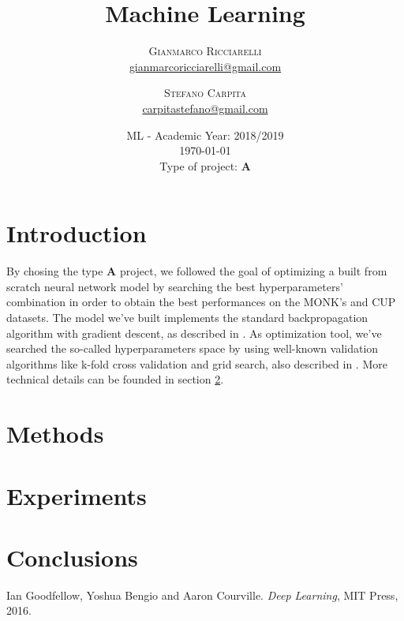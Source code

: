 \documentclass[11pt,twoside]{article}
\title{Machine Learning} %
\author{%
\textsc{Gianmarco Ricciarelli} \\[1ex] %
\normalsize \href{mailto:john@smith.com}{gianmarcoricciarelli@gmail.com} %
\and %
\textsc{Stefano Carpita} \\[1ex] %
\normalsize \href{mailto:jane@smith.com}{carpitastefano@gmail.com} %
}
\date{
    ML - Academic Year: 2018/2019 \\
    \today \\
    Type of project: \textbf{A}
}
\begin{document}
\maketitle


\section{Introduction} %
\label{sec:introduction}
    By chosing the type \textbf{A} project, we followed the goal of optimizing a built from scratch neural
    network model by searching the best hyperparameters' combination in order to obtain the best
    performances on the MONK's and CUP datasets. The model we've built implements the
    standard backpropagation algorithm with gradient descent, as described in \cite{deep_learning}. As
    optimization tool, we've searched the so-called hyperparameters space by using well-known validation
    algorithms like k-fold cross validation and grid search, also described in \cite{deep_learning}. More
    technical details can be founded in section \ref{sec:methods}.


\section{Methods} %
\label{sec:methods}



\section{Experiments}


\section{Conclusions}


\begin{thebibliography}{99} %
    Ian Goodfellow, Yoshua Bengio and Aaron Courville.
    \textit{Deep Learning}, MIT Press, 2016.
\end{thebibliography}

\end{document}
